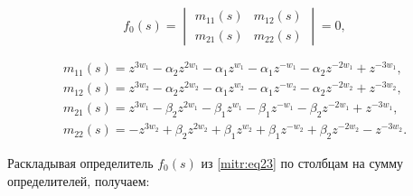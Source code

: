 \begin{equation}

\label{mitr:eq23}

f_{0}(s)= \begin{vmatrix}

m_{11} (s) &m_{12} (s)\\

m_{21} (s) &m_{22}(s)

\end{vmatrix}=0,

\end{equation}

\begin{equation*}

\begin{gathered}

m_{11} (s)=z^{3w_1}-\alpha_2 z^{2w_1}-\alpha_1z^{w_1}-\alpha_1z^{-w_1}-\alpha_2z^{-2w_1}+z^{-3w_1},\\

m_{12} (s)=z^{3w_2}-\alpha_2 z^{2w_2}-\alpha_1z^{w_2}-\alpha_1z^{-w_2}-\alpha_2z^{-2w_2}+z^{-3w_2},\\

m_{21} (s)=z^{3w_1}-\beta_2 z^{2w_1}-\beta_1z^{w_1}-\beta_1z^{-w_1}-\beta_2z^{-2w_1}+z^{-3w_1},\\

m_{22} (s)=-z^{3w_2}+\beta_2 z^{2w_2}+\beta_1z^{w_2}+\beta_1z^{-w_2}+\beta_2z^{-2w_2}-z^{-3w_2}.

\end{gathered}

\end{equation*}



Раскладывая определитель $f_0(s)$ из \eqref{mitr:eq23} по столбцам на сумму определителей, получаем:

